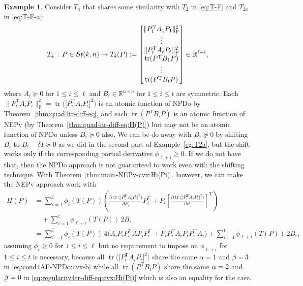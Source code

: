 \documentclass[11pt]{article}
\def\bbR{\mathbb{R}}
\newcommand\munderbar[1]{%
  \underaccent{\bar}{#1}}
\newcommand\STM[2]{{\rm St}(#1,#2)}
\DeclareMathOperator{\tr}{tr}
\DeclareMathOperator{\F}{F}
\DeclareMathOperator{\T}{T}
\theoremstyle{definition}
\newtheorem{example}{Example}[section]
\numberwithin{equation}{section}
\begin{document}
\begin{example}\label{eg:T4}
Consider $T_4$ that shares some similarity with $T_2$ in \eqref{eq:T-F} and $T_{2a}$ in \eqref{eq:T-F-a}:
\begin{equation}\label{eq:T-F-b}
T_4\,:\, P\in\STM{k}{n} \to T_4(P):=\begin{bmatrix}
                                        \|P_1^{\T}A_1P_1\|_{\F}^2 \\
                                        \vdots \\
                                        \|P_{\ell}^{\T}A_{\ell}P_{\ell}\|_{\F}^2 \\
                                        \tr(P^{\T}B_1P) \\
                                        \vdots \\
                                        \tr(P^{\T}B_tP)
                                      \end{bmatrix} \in\bbR^{\ell+t},
\end{equation}
where $A_i\succeq 0$ for $1\le i\le \ell$ and $B_i\in\bbR^{n\times n}$ for $1\le i\le t$ are symmetric.
Each $\|P_i^{\T}A_iP_i\|_{\F}^2=\tr\big(\big[P_i^{\T}A_iP_i\big]^2\big)$ is an atomic function of NPDo by Theorem~\ref{thm:quad4tr-diff-eq},
and each $\tr(P^{\T}B_iP)$ is an atomic function of NEPv (by  Theorem~\ref{thm:quad4tr-diff-eq:H(P)})
but may not be an atomic function of NPDo unless $B_i\succeq 0$ also.
We can be do away with $B_i\not\succeq 0$ by shifting $B_i$ to $B_i-\delta I\succeq 0$ as we did in
the second part of Example~\ref{eg:T2a}, but the shift works only if the corresponding
partial derivative $\phi_{\ell+i}\ge 0$.
If we do not have that, then the NPDo approach is not guaranteed to work even with the shifting technique.
With Theorem~\ref{thm:main-NEPv-cvx:Hi(Pi)}, however,
we can make the NEPv approach work with
\begin{align*}
H(P)&=\sum_{i=1}^{\ell}\phi_i(T(P))\left(\frac {\partial \tr\big(\big[P_i^{\T}A_iP_i\big]^2\big)}{\partial P_i}P_i^{\T}
             +P_i\left[\frac {\partial \tr\big(\big[P_i^{\T}A_iP_i\big]^2\big)}{\partial P_i}\right]^{\T}\right) \\
    &\quad         +\sum_{i=1}^t\phi_{\ell+i}(T(P))\,2B_i \\
    &=\sum_{i=1}^{\ell}\phi_i(T(P))\,4\Big(A_iP_iP_i^{\T}AP_iP_i^{\T}+P_iP_i^{\T}A_iP_iP_i^{\T}A_i\Big)
     +\sum_{i=1}^t\phi_{\ell+i}(T(P))\,2B_i,
\end{align*}
assuming $\phi_i\ge 0$ for $1\le i\le\ell$ but no requirement  to impose on $\phi_{\ell+i}$ for $1\le i\le t$ is necessary,
because all $\tr\big(\big[P_i^{\T}A_iP_i\big]^2\big)$ share the same
$\alpha=1$ and $\beta=3$ in \eqref{eq:cond4AF-NPDo:cvx-b}
while all $\tr(P^{\T}B_iP)$ share the same $\munderbar\alpha=2$ and $\munderbar\beta=0$ in \eqref{eq:regularity4tr-diff-eq:cvx:Hi(Pi)}
which is also an equality for the case.
\end{example}
\end{document}
